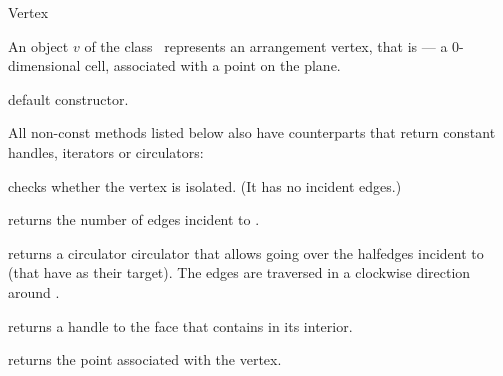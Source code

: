 
\ccRefPageBegin

\begin{ccRefClass}{Vertex}

\ccDefinition
An object $v$ of the class \ccRefName\ represents an arrangement vertex,
that is --- a $0$-dimensional cell, associated with a point on the plane. 

\ccInheritsFrom

\ccThreeToTwo

\ccCreation
{}

    {default constructor.}    

\ccAccessFunctions

All non-const methods listed below also have  counterparts
that return constant handles, iterators or circulators:

    {checks whether the vertex is isolated. (It has no incident edges.)}

    {returns the number of edges incident to \ccVar{}.}


    {returns a circulator circulator that allows going over the halfedges
     incident to \ccVar{} (that have \ccVar{} as their target).
     The edges are traversed in a clockwise direction around \ccVar{}.
     }


    {returns a handle to the face that contains \ccVar{} in its interior.
     }

    {returns the point associated with the vertex.}

\end{ccRefClass}

\ccRefPageEnd
